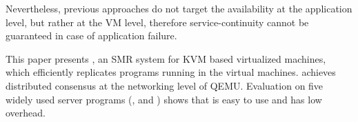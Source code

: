 
Nevertheless, previous approaches do not target the availability at the application 
level, but rather at the VM level, therefore service-continuity cannot be 
guaranteed in case of application failure.

This paper presents \xxx, an SMR system for KVM based virtualized machines, 
which efficiently replicates programs running in the virtual machines. 
\xxx achieves distributed consensus at the networking level of QEMU. 
Evaluation on five widely used server programs (\eg, \mysql and \redis) shows 
that \xxx is easy to use and has low overhead.
